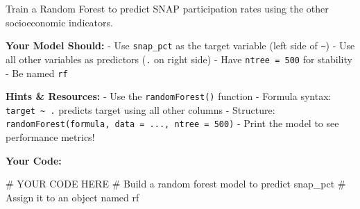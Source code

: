 \documentclass[
  letterpaper,
  DIV=11,
  numbers=noendperiod]{scrartcl}
\newenvironment{Shaded}{\begin{snugshade}}{\end{snugshade}}
\newcommand{\CommentTok}[1]{\textcolor[rgb]{0.37,0.37,0.37}{#1}}
\begin{document}
\begin{tcolorbox}[enhanced jigsaw, title=\textcolor{quarto-callout-warning-color}{\faExclamationTriangle}\hspace{0.5em}{Your Task}, titlerule=0mm, coltitle=black, colbacktitle=quarto-callout-warning-color!10!white, colback=white, left=2mm, toprule=.15mm, opacitybacktitle=0.6, toptitle=1mm, colframe=quarto-callout-warning-color-frame, bottomtitle=1mm, arc=.35mm, bottomrule=.15mm, breakable, leftrule=.75mm, opacityback=0, rightrule=.15mm]

Train a Random Forest to predict SNAP participation rates using the
other socioeconomic indicators.

\textbf{Your Model Should:} - Use \texttt{snap\_pct} as the target
variable (left side of \texttt{\textasciitilde{}}) - Use all other
variables as predictors (\texttt{.} on right side) - Have
\texttt{ntree\ =\ 500} for stability - Be named \texttt{rf}

\textbf{Hints \& Resources:} - Use the \texttt{randomForest()} function
- Formula syntax: \texttt{target\ \textasciitilde{}\ .} predicts target
using all other columns - Structure:
\texttt{randomForest(formula,\ data\ =\ ...,\ ntree\ =\ 500)} - Print
the model to see performance metrics!

\textbf{Your Code:}

\end{tcolorbox}

\begin{Shaded}
\begin{Highlighting}[]
\CommentTok{\# YOUR CODE HERE}
\CommentTok{\# Build a random forest model to predict snap\_pct}
\CommentTok{\# Assign it to an object named \textquotesingle{}rf\textquotesingle{}}
\end{Highlighting}
\end{Shaded}
\end{document}
